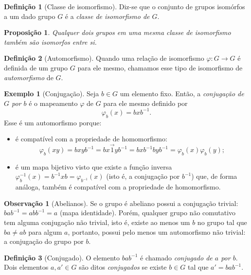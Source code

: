 \documentclass[a4paper,12pt]{report}
\theoremstyle{plain}
\newtheorem{proposicao}{Proposição}[section]
\theoremstyle{definition}
\newtheorem{definicao}{Definição}[section]
\newtheorem{observacao}{Observação}[section]
\newtheorem{exemplo}{Exemplo}[section]
\begin{document}
\begin{definicao}[Classe de isomorfismo]
	Diz-se que o conjunto de grupos isomórfos a um dado grupo \(G\) é a \emph{classe de isomorfismo de \(G\)}.	
\end{definicao}

\begin{proposicao}
	Qualquer dois grupos em uma mesma classe de isomorfismo também são isomorfos entre si.
\end{proposicao}

\begin{definicao}[Automorfismo]
	Quando uma relação de isomorfismo \(\varphi: G\longrightarrow G\) é definida de um grupo \(G\) para ele mesmo,	chamamos esse tipo de isomorfismo de \emph{automorfismo} de \(G\).
\end{definicao}

\begin{exemplo}[Conjugação]
	 Seja \(b\in G\) um elemento fixo. Então, a
	\emph{conjugação de \(G\) por \(b\)} é o mapeamento \(\varphi\) de \(G\)
	para ele mesmo definido por
	\[\varphi_b(x) = bxb^{-1}.\]
	Esse é um automorfismo porque:
	\begin{itemize}
		\item é compatível com a propriedade de homomorfismo: \[\varphi_b(xy) = bxyb^{-1} = bx\vec{1}yb^{-1} = bxb^{-1}byb^{-1} = \varphi_b(x)\varphi_b(y);\]
		\item é um mapa bijetivo visto que existe a função inversa $\varphi_b^{-1}(x) = b^{-1}xb = \varphi_{b^{-1}}(x)$ (isto é, a conjugação por \(b^{-1}\)) que, de forma análoga, também é compatível com a propriedade de homomorfismo.
	\end{itemize}
\end{exemplo}

\begin{observacao}[Abelianos]\label{ob:conjugadosDeAbelianos}
	Se o grupo é abeliano possui a conjugação trivial:
	\(bab^{ -1} = abb^{-1} = a\) (mapa identidade). Porém, qualquer grupo não comutativo tem alguma conjugação não trivial, isto é, existe ao menos um $b$ no grupo tal que $ba \neq ab$ para algum $a$, portanto, possui pelo menos um automorfismo não trivial: a conjugação do grupo por $b$. 
\end{observacao}

\begin{definicao}[Conjugado]
	O elemento \(bab^{-1}\) é chamado \emph{conjugado de \(a\) por \(b\)}. Dois elementos \(a, a'\in G\) são ditos \emph{conjugados} se existe \(b\in G\) tal que \(a' = bab^{-1}\).	
\end{definicao}
\end{document}
